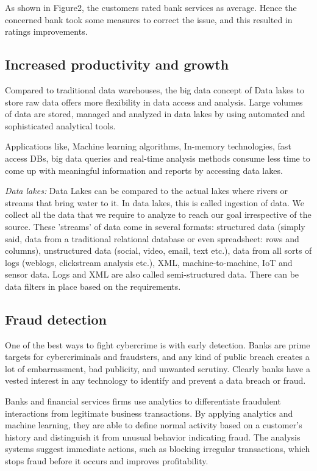 \documentclass[sigconf]{acmart}
\begin{document}
As shown in Figure2, the customers rated bank services as average. Hence the concerned bank took some measures to correct the issue, and this resulted in ratings improvements.

\subsection{Increased productivity and growth}
Compared to traditional data warehouses, the big data concept of Data lakes to store raw data offers more flexibility in data access and analysis. Large volumes of data are stored, managed and analyzed in data lakes  by using automated and sophisticated analytical tools. 

Applications like, Machine learning algorithms, In-memory technologies, fast access DBs, big data queries and real-time analysis methods consume less time to come up with meaningful information and reports by accessing data lakes.

\textit{Data lakes:} Data Lakes can be compared to the actual lakes where rivers or streams that bring water to it. In data lakes, this is called ingestion of data. We collect all the data that we require to analyze to reach our goal irrespective of the source. These 'streams' of data come in several formats: structured data (simply said, data from a traditional relational database or even spreadsheet: rows and columns), unstructured data (social, video, email, text etc.), data from all sorts of logs (weblogs, clickstream analysis etc.), XML, machine-to-machine, IoT and sensor data. Logs and XML are also called semi-structured data. There can be data filters in place based on the requirements\cite{Data-lakes}.

\subsection{Fraud detection}
One of the best ways to fight cybercrime is with early detection. Banks are prime targets for cybercriminals and fraudsters, and any kind of public breach creates a lot of embarrassment, bad publicity, and unwanted scrutiny. Clearly banks have a vested interest in any technology to identify and prevent a data breach or fraud\cite{the-top-5-trends-for-big-data-in-financial-services}.

Banks and financial services firms use analytics to differentiate fraudulent interactions from legitimate business transactions. By applying analytics and machine learning, they are able to define normal activity based on a customer's history and distinguish it from unusual behavior indicating fraud. The analysis systems suggest immediate actions, such as blocking irregular transactions, which stops fraud before it occurs and improves profitability\cite{5-big-data-use-cases-in-banking-and-financial-services}.
\end{document}
